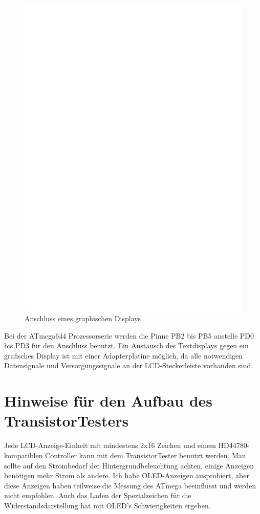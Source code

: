 \begin{figure}[H]
\centering
\includegraphics[width=14cm]{../FIG/ST7565lcd.eps}
\caption{Anschluss eines graphischen Displays}
\label{fig:ST7565lcd}
\end{figure}

Bei der ATmega644 Prozessorserie werden die Pinne PB2 bis PB5 anstelle PD0 bis PD3 für den Anschluss benutzt.
Ein Austausch des Textdisplays gegen ein grafisches Display ist mit einer Adapterplatine möglich, da
alle notwendigen Datensignale und Versorgungssignale an der LCD-Steckerleiste vorhanden sind.

\section{Hinweise für den Aufbau des TransistorTesters}
Jede LCD-Anzeige-Einheit mit mindestens 2x16 Zeichen und einem HD44780-kompatiblen Controller kann mit
dem TransistorTester benutzt werden.
Man sollte auf den Strombedarf der Hintergrundbeleuchtung achten, einige Anzeigen benötigen
mehr Strom als andere.
Ich habe OLED-Anzeigen ausprobiert, aber diese Anzeigen haben teilweise die Messung des
ATmega beeinflusst und werden nicht empfohlen. Auch das Laden der Spezialzeichen für die 
Widerstandsdarstellung hat mit OLED's Schwierigkeiten ergeben.

